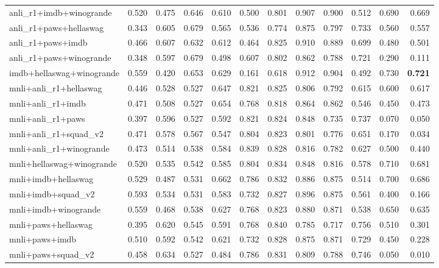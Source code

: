 \begin{table}[t]
\begin{tabular}{lrrrrrrrrrrr}
    anli\_r1+imdb+winogrande & 0.520 & 0.475 & 0.646 & 0.610 & 0.500 & 0.801 & 0.907 & 0.900 & 0.512 & 0.690 & 0.669 \\
    anli\_r1+paws+hellaswag & 0.343 & 0.605 & 0.679 & 0.565 & 0.536 & 0.774 & 0.875 & 0.797 & 0.733 & 0.560 & 0.557 \\
    anli\_r1+paws+imdb & 0.466 & 0.607 & 0.632 & 0.612 & 0.464 & 0.825 & 0.910 & 0.889 & 0.699 & 0.480 & 0.501 \\
    anli\_r1+paws+winogrande & 0.348 & 0.597 & 0.679 & 0.498 & 0.607 & 0.802 & 0.862 & 0.788 & 0.721 & 0.290 & 0.111 \\
    imdb+hellaswag+winogrande & 0.559 & 0.420 & 0.653 & 0.629 & 0.161 & 0.618 & 0.912 & 0.904 & 0.492 & 0.730 & \textbf{0.721} \\
    mnli+anli\_r1+hellaswag & 0.446 & 0.528 & 0.527 & 0.647 & 0.821 & 0.825 & 0.806 & 0.792 & 0.615 & 0.600 & 0.617 \\
    mnli+anli\_r1+imdb & 0.471 & 0.508 & 0.527 & 0.654 & 0.768 & 0.818 & 0.864 & 0.862 & 0.546 & 0.450 & 0.473 \\
    mnli+anli\_r1+paws & 0.397 & 0.596 & 0.527 & 0.592 & 0.821 & 0.824 & 0.848 & 0.735 & 0.737 & 0.070 & 0.050 \\
    mnli+anli\_r1+squad\_v2 & 0.471 & 0.578 & 0.567 & 0.547 & 0.804 & 0.823 & 0.801 & 0.776 & 0.651 & 0.170 & 0.034 \\
    mnli+anli\_r1+winogrande & 0.473 & 0.514 & 0.538 & 0.584 & 0.839 & 0.828 & 0.816 & 0.782 & 0.627 & 0.500 & 0.440 \\
    mnli+hellaswag+winogrande & 0.520 & 0.535 & 0.542 & 0.585 & 0.804 & 0.834 & 0.848 & 0.816 & 0.578 & 0.710 & 0.681 \\
    mnli+imdb+hellaswag & 0.529 & 0.487 & 0.531 & 0.662 & 0.786 & 0.832 & 0.886 & 0.875 & 0.514 & 0.700 & 0.686 \\
    mnli+imdb+squad\_v2 & 0.593 & 0.534 & 0.531 & 0.583 & 0.732 & 0.827 & 0.896 & 0.875 & 0.561 & 0.400 & 0.166 \\
    mnli+imdb+winogrande & 0.559 & 0.468 & 0.538 & 0.627 & 0.768 & 0.823 & 0.880 & 0.871 & 0.538 & 0.650 & 0.635 \\
    mnli+paws+hellaswag & 0.395 & 0.620 & 0.545 & 0.591 & 0.768 & 0.840 & 0.785 & 0.717 & 0.756 & 0.510 & 0.301 \\
    mnli+paws+imdb & 0.510 & 0.592 & 0.542 & 0.621 & 0.732 & 0.828 & 0.875 & 0.871 & 0.729 & 0.450 & 0.228 \\
    mnli+paws+squad\_v2 & 0.458 & 0.634 & 0.527 & 0.484 & 0.786 & 0.831 & 0.809 & 0.788 & 0.746 & 0.050 & 0.010 \\

\end{tabular}
\end{table}
